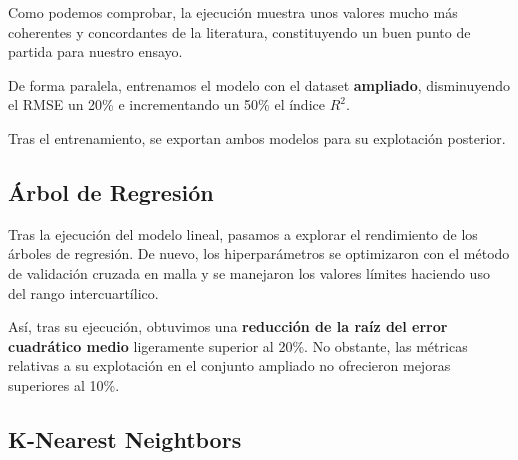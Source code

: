 Como podemos comprobar, la ejecución muestra unos valores mucho más coherentes y concordantes de la literatura, constituyendo un buen punto de partida para nuestro ensayo.


De forma paralela, entrenamos el modelo con el dataset \textbf{ampliado}, disminuyendo el RMSE un 20\% e incrementando un 50\% el índice $R^{2}$.

Tras el entrenamiento, se exportan ambos modelos para su explotación posterior.


\subsection{Árbol de Regresión}

Tras la ejecución del modelo lineal, pasamos a explorar el rendimiento de los árboles de regresión.
De nuevo, los hiperparámetros se optimizaron con el método de validación cruzada en malla y se manejaron los valores límites haciendo uso del rango intercuartílico.

Así, tras su ejecución, obtuvimos una \textbf{reducción de la raíz del error cuadrático medio} ligeramente superior al 20\%. No obstante, las métricas relativas a su explotación en el conjunto ampliado no ofrecieron mejoras superiores al 10\%.


\subsection{K-Nearest Neightbors}



 